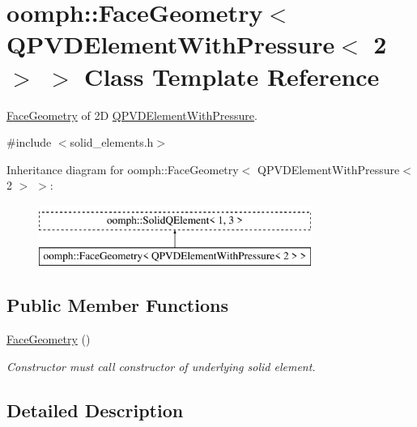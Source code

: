 \hypertarget{classoomph_1_1FaceGeometry_3_01QPVDElementWithPressure_3_012_01_4_01_4}{}\section{oomph\+:\+:Face\+Geometry$<$ Q\+P\+V\+D\+Element\+With\+Pressure$<$ 2 $>$ $>$ Class Template Reference}
\label{classoomph_1_1FaceGeometry_3_01QPVDElementWithPressure_3_012_01_4_01_4}


\hyperlink{classoomph_1_1FaceGeometry}{Face\+Geometry} of 2D \hyperlink{classoomph_1_1QPVDElementWithPressure}{Q\+P\+V\+D\+Element\+With\+Pressure}.  




{\ttfamily \#include $<$solid\+\_\+elements.\+h$>$}

Inheritance diagram for oomph\+:\+:Face\+Geometry$<$ Q\+P\+V\+D\+Element\+With\+Pressure$<$ 2 $>$ $>$\+:\begin{figure}[H]
\begin{center}
\leavevmode
\includegraphics[height=2.000000cm]{classoomph_1_1FaceGeometry_3_01QPVDElementWithPressure_3_012_01_4_01_4}
\end{center}
\end{figure}
\subsection*{Public Member Functions}
\begin{DoxyCompactItemize}
\item 
\hyperlink{classoomph_1_1FaceGeometry_3_01QPVDElementWithPressure_3_012_01_4_01_4_ac297cef6558e3e7ad0b78df5a6325446}{Face\+Geometry} ()
\begin{DoxyCompactList}\small\item\em Constructor must call constructor of underlying solid element. \end{DoxyCompactList}\end{DoxyCompactItemize}


\subsection{Detailed Description}
